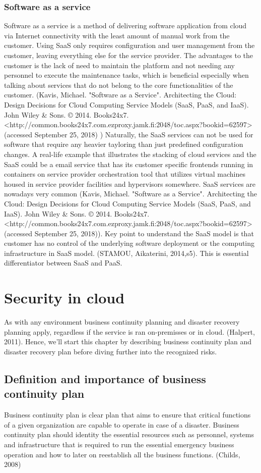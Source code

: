 \documentclass{article}
\begin{document}
\subsubsection{Software as a service}
Software as a service is a method of delivering software application from cloud via Internet connectivity with the least amount of manual work from the customer. Using SaaS only requires configuration and user management from the customer, leaving everything else for the service provider. The advantages to the customer is the lack of need to maintain the platform and not needing any personnel to execute the maintenance tasks, which is beneficial especially when talking about services that do not belong to the core functionalities of the customer. (Kavis, Michael. "Software as a Service". Architecting the Cloud: Design Decisions for Cloud Computing Service Models (SaaS, PaaS, and IaaS). John Wiley \& Sons. © 2014. Books24x7. <http://common.books24x7.com.ezproxy.jamk.fi:2048/toc.aspx?bookid=62597> (accessed September 25, 2018) ) Naturally, the SaaS services can not be used for software that require any heavier tayloring than just predefined configuration changes.
A real-life example that illustrates the stacking of cloud services and the SaaS could be a email service that has its customer specific frontends running in containers on service provider orchestration tool that utilizes virtual machines housed in service provider facilities and hypervisors somewhere. SaaS services are nowadays very common (Kavis, Michael. "Software as a Service". Architecting the Cloud: Design Decisions for Cloud Computing Service Models (SaaS, PaaS, and IaaS). John Wiley \& Sons. © 2014. Books24x7. <http://common.books24x7.com.ezproxy.jamk.fi:2048/toc.aspx?bookid=62597> (accessed September 25, 2018)).
Key point to understand the SaaS model is that customer has no control of the underlying software deployment or the computing infrastructure in SaaS model. (STAMOU, Aikaterini, 2014,s5). This is essential differentiator between SaaS and PaaS.
\section{Security in cloud}
As with any environment business continuity planning and disaster recovery planning apply, regardless if the service is ran on-premisses or in cloud. (Halpert, 2011).
Hence, we'll start this chapter by describing business continuity plan and disaster recovery plan before diving further into the recognized risks.
\subsection{Definition and importance of business continuity plan}
Business continuity plan is clear plan that aims to ensure that critical functions of a given organization are capable to operate in case of a disaster.
Business continuity plan should identity the essential resources such as personnel, systems and infrastructure that is required to run the essential emergency business operation and how to later on reestablish all the business functions. (Childs, 2008)
\end{document}
